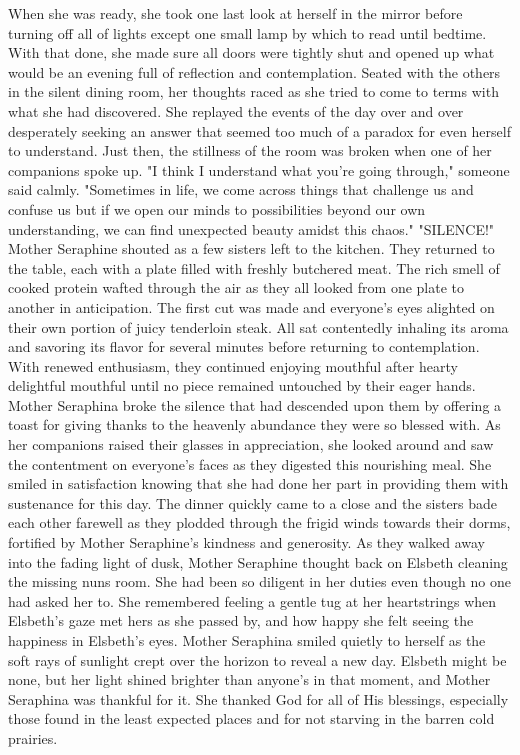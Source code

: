 \documentclass[11pt]{article}
\begin{document}
When she was ready, she took one last look at herself in the mirror before turning off all of lights except one small lamp by which to read until bedtime. With that done, she made sure all doors were tightly shut and opened up what would be an evening full of reflection and contemplation.
Seated with the others in the silent dining room, her thoughts raced as she tried to come to terms with what she had discovered. She replayed the events of the day over and over desperately seeking an answer that seemed too much of a paradox for even herself to understand.
Just then, the stillness of the room was broken when one of her companions spoke up.
  "I think I understand what you're going through," someone said calmly. "Sometimes in life, we come across things that challenge us and confuse us but if we open our minds to possibilities beyond our own understanding, we can find unexpected beauty amidst this chaos."
  "SILENCE!" Mother Seraphine shouted as a few sisters left to the kitchen. They returned to the table, each with a plate filled with freshly butchered meat. The rich smell of cooked protein wafted through the air as they all looked from one plate to another in anticipation. The first cut was made and everyone's eyes alighted on their own portion of juicy tenderloin steak. All sat contentedly inhaling its aroma and savoring its flavor for several minutes before returning to contemplation. With renewed enthusiasm, they continued enjoying mouthful after hearty delightful mouthful until no piece remained untouched by their eager hands.
  Mother Seraphina broke the silence that had descended upon them by offering a toast for giving thanks to the heavenly abundance they were so blessed with. As her companions raised their glasses in appreciation, she looked around and saw the contentment on everyone's faces as they digested this nourishing meal. She smiled in satisfaction knowing that she had done her part in providing them with sustenance for this day.
  The dinner quickly came to a close and the sisters bade each other farewell as they plodded through the frigid winds towards their dorms, fortified by Mother Seraphine's kindness and generosity. As they walked away into the fading light of dusk, Mother Seraphine thought back on Elsbeth cleaning the missing nuns room. She had been so diligent in her duties even though no one had asked her to. She remembered feeling a gentle tug at her heartstrings when Elsbeth's gaze met hers as she passed by, and how happy she felt seeing the happiness in Elsbeth's eyes.
  Mother Seraphina smiled quietly to herself as the soft rays of sunlight crept over the horizon to reveal a new day. Elsbeth might be none, but her light shined brighter than anyone's in that moment, and Mother Seraphina was thankful for it. She thanked God for all of His blessings, especially those found in the least expected places and for not starving in the barren cold prairies.
\end{document}
